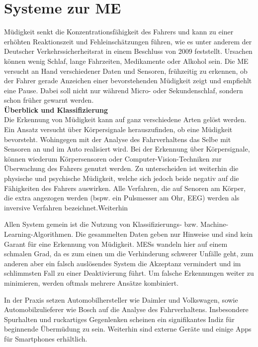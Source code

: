 {\section{Systeme zur \acl{ME}}
\label{chap:me}
Müdigkeit senkt die Konzentrationsfähigkeit des Fahrers und kann zu einer erhöhten Reaktionszeit und Fehleinschätzungen führen, wie es unter anderem der Deutscher Verkehrssicherheitsrat in einem Beschluss von 2009 \cite{DVR:Online} feststellt. Ursachen können wenig Schlaf, lange Fahrzeiten, Medikamente oder Alkohol sein.
Die \acl{ME} versucht an Hand verschiedener Daten und Sensoren, frühzeitig zu erkennen, ob der Fahrer gerade Anzeichen einer bevorstehenden Müdigkeit zeigt und empfiehlt eine Pause.
Dabei soll nicht nur während Micro- oder Sekundenschlaf, sondern schon früher gewarnt werden. \\

\textbf{Überblick und Klassifizierung} \\
Die Erkennung von Müdigkeit kann auf ganz verschiedene Arten gelöst werden. Ein Ansatz versucht über Körpersignale herauszufinden, ob eine Müdigkeit bevorsteht. Wohingegen mit der Analyse des Fahrverhaltens das Selbe mit Sensoren an und im Auto realisiert wird.
Bei der Erkennung über Körpersignale, können wiederum Körpersensoren oder Computer-Vision-Techniken zur Überwachung des Fahrers genutzt werden. Zu unterscheiden ist weiterhin die physische und psychische Müdigkeit, welche sich jedoch beide negativ auf die Fähigkeiten des Fahrers auswirken. Alle Verfahren, die auf Senoren am Körper, die extra angezogen werden (bspw. ein Pulsmesser am Ohr, EEG) werden als inversive Verfahren bezeichnet.Weiterhin 

Allen System gemein ist die Nutzung von Klassifizierungs- bzw. Machine-Learning-Algorithmen. Die gesammelten Daten geben nur Hinweise und sind kein Garant für eine Erkennung von Müdigkeit. \acl{MESs} wandeln hier auf einem schmalen Grad, da es zum einen um die Verhinderung schwerer Unfälle geht, zum anderen aber ein falsch auslösendes System die Akzeptanz vermindert und im schlimmsten Fall zu einer Deaktivierung führt. Um falsche Erkennungen weiter zu minimieren, werden oftmals mehrere Ansätze kombiniert.

In der Praxis setzen Automobilhersteller wie Daimler \cite{Daimler} und Volkswagen, sowie Automobilzulieferer wie Bosch \cite{Bosch} auf die Analyse des Fahrverhaltens. Insbesondere Spurhalten und ruckartiges Gegenlenken scheinen ein signifikantes Indiz für beginnende Übermüdung zu sein. Weiterhin sind externe Geräte und einige Apps für Smartphones erhältlich. \\

}
